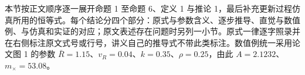 本节按正文顺序逐一展开命题 1 至命题 6、定义 1 与推论 1，最后补充更新过程仿真所用的恒等式。每个结论分四个部分：原式与参数含义、逐步推导、直觉与数值例、与仿真和实证的对应；原文表述存在问题时另列一小节。原式一律逐字照录并在右侧标注原文式号或行号，讲义自己的推导式不带此类标注。数值例统一采用论文图 1 的参数 $\bar R=1.15$、$v_R=0.04$、$k=0.35$、$\rho=0.25$，由此 $A=2.1232$、$m_\times=53.08$。

